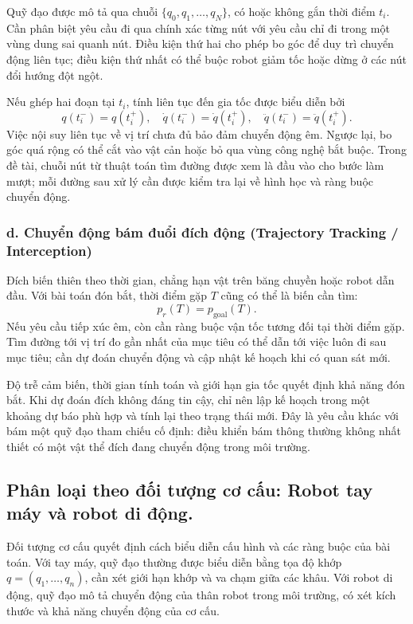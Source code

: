 \documentclass[12pt,a4paper,oneside]{report}
\begin{document}
Quỹ đạo được mô tả qua chuỗi \(\{q_0,q_1,\ldots,q_N\}\), có hoặc không gắn thời điểm \(t_i\). Cần phân biệt yêu cầu đi qua chính xác từng nút với yêu cầu chỉ đi trong một vùng dung sai quanh nút. Điều kiện thứ hai cho phép bo góc để duy trì chuyển động liên tục; điều kiện thứ nhất có thể buộc robot giảm tốc hoặc dừng ở các nút đổi hướng đột ngột.

Nếu ghép hai đoạn tại \(t_i\), tính liên tục đến gia tốc được biểu diễn bởi
\[
  q(t_i^-)=q(t_i^+),\quad
  \dot q(t_i^-)=\dot q(t_i^+),\quad
  \ddot q(t_i^-)=\ddot q(t_i^+).
\]
Việc nội suy liên tục về vị trí chưa đủ bảo đảm chuyển động êm. Ngược lại, bo góc quá rộng có thể cắt vào vật cản hoặc bỏ qua vùng công nghệ bắt buộc. Trong đề tài, chuỗi nút từ thuật toán tìm đường được xem là đầu vào cho bước làm mượt; mỗi đường sau xử lý cần được kiểm tra lại về hình học và ràng buộc chuyển động.

\subsubsection*{d. Chuyển động bám đuổi đích động (Trajectory Tracking / Interception)}

Đích biến thiên theo thời gian, chẳng hạn vật trên băng chuyền hoặc robot dẫn đầu. Với bài toán đón bắt, thời điểm gặp \(T\) cũng có thể là biến cần tìm:
\[
  p_r(T)=p_{\mathrm{goal}}(T).
\]
Nếu yêu cầu tiếp xúc êm, còn cần ràng buộc vận tốc tương đối tại thời điểm gặp. Tìm đường tới vị trí đo gần nhất của mục tiêu có thể dẫn tới việc luôn đi sau mục tiêu; cần dự đoán chuyển động và cập nhật kế hoạch khi có quan sát mới.

Độ trễ cảm biến, thời gian tính toán và giới hạn gia tốc quyết định khả năng đón bắt. Khi dự đoán đích không đáng tin cậy, chỉ nên lập kế hoạch trong một khoảng dự báo phù hợp và tính lại theo trạng thái mới. Đây là yêu cầu khác với bám một quỹ đạo tham chiếu cố định: điều khiển bám thông thường không nhất thiết có một vật thể đích đang chuyển động trong môi trường.

\subsection{Phân loại theo đối tượng cơ cấu: Robot tay máy và robot di động.}

Đối tượng cơ cấu quyết định cách biểu diễn cấu hình và các ràng buộc của bài toán. Với tay máy, quỹ đạo thường được biểu diễn bằng tọa độ khớp \(q=(q_1,\ldots,q_n)\), cần xét giới hạn khớp và va chạm giữa các khâu. Với robot di động, quỹ đạo mô tả chuyển động của thân robot trong môi trường, có xét kích thước và khả năng chuyển động của cơ cấu.
\end{document}
